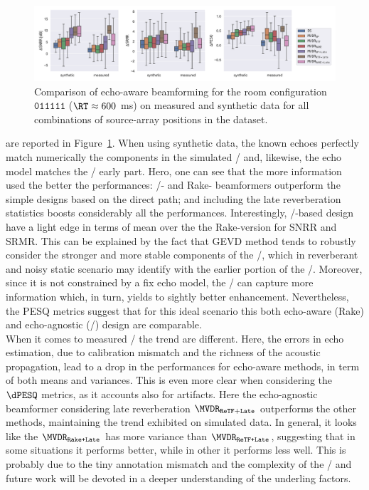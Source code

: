 \begin{figure}[t]
    \begin{fullwidth}
        \centering
        \includegraphics[trim={0 10 10 0},clip,width=\linewidth]{figures/dechorateapp/kowalkzy_results_boxplot.pdf}
        \caption{
        Comparison of echo-aware beamforming for the room configuration $\mathtt{011111}$ ($\RT \approx 600 $ ms) on measured and synthetic data  for all combinations of source-array positions in the \dEchorate{} dataset.}
        \label{fig:dechorateapp:se:results}
    \end{fullwidth}
\end{figure}
 are reported in Figure~\ref{fig:dechorateapp:se:results}.
When using synthetic data, the known echoes perfectly match numerically the components in the simulated \RIRs/ and, likewise, the echo model matches the \RIRs/ early part.
Hero, one can see that the more information used the better the performances: \ReTF/- and Rake- beamformers outperform the simple designs based on the direct path; and including the late reverberation statistics boosts considerably all the performances.
Interestingly, \ReTF/-based design have a light edge in terms of mean over the the Rake-version for \ac{SNRR} and \ac{SRMR}.
This can be explained by the fact that \ac{GEVD} method tends to robustly consider the stronger and more stable components of the \ReTFs/, which in reverberant and noisy static scenario may identify with the earlier portion of the \RIRs/.
Moreover, since it is not constrained by a fix echo model, the \ReTFs/ can capture more information which, in turn, yields to sightly better enhancement.
Nevertheless, the \ac{PESQ} metrics suggest that for this ideal scenario this both echo-aware (Rake) and echo-agnostic (\ReTF/) design are comparable.
\\When it comes to measured \RIRs/ the trend are different.
Here, the errors in echo estimation, due to calibration mismatch and the richness of the acoustic propagation, lead to a drop in the performances for echo-aware methods, in term of both means and variances.
This is even more clear when considering the $\dPESQ$ metrics, as it accounts also for artifacts.
Here the echo-agnostic beamformer considering late reverberation $\MVDR_\mathtt{ReTF+Late}$ outperforms the other methods, maintaining the trend exhibited on simulated data.
In general, it looks like the $\MVDR_\texttt{Rake+Late}$ has more variance than $\MVDR_\texttt{ReTF+Late}$, suggesting that in some situations it performs better, while in other it performs less well.
This is probably due to the tiny annotation mismatch and the complexity of the \RIRs/ and future work will be devoted in a deeper understanding of the underling factors.

